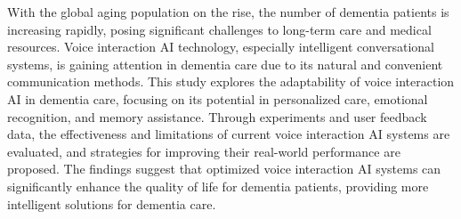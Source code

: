 


\begin{eabstract}

With the global aging population on the rise, the number of dementia patients is increasing rapidly, posing significant challenges to long-term care and medical resources. Voice interaction AI technology, especially intelligent conversational systems, is gaining attention in dementia care due to its natural and convenient communication methods. This study explores the adaptability of voice interaction AI in dementia care, focusing on its potential in personalized care, emotional recognition, and memory assistance. Through experiments and user feedback data, the effectiveness and limitations of current voice interaction AI systems are evaluated, and strategies for improving their real-world performance are proposed. The findings suggest that optimized voice interaction AI systems can significantly enhance the quality of life for dementia patients, providing more intelligent solutions for dementia care.


\end{eabstract}

